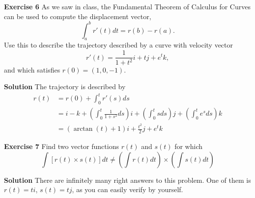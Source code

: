 \documentclass[12pt,oneside]{exam}
\newenvironment{exercise}[1]{\vspace{.1in}\noindent\textbf{Exercise #1 \hspace{.05em}}}{}
\newenvironment{newsolution}{\vspace{.1in}\noindent\textbf{Solution \hspace{.05em}}}{}
\begin{document}
\begin{exercise}{6}
As we saw in class, the Fundamental Theorem of Calculus for Curves can be used to compute the displacement vector, 
\begin{equation*}
\int_{a}^{b} r'(t) dt = r(b)-r(a).
\end{equation*}
Use this to describe the trajectory described by a curve with velocity vector 
\begin{equation*}
r'(t)=\frac{1}{1+t^2} i + tj + e^tk, 
\end{equation*}
and which satisfies $r(0)=(1,0,-1)$. 
\end{exercise}

\begin{newsolution}
The trajectory is described by 
\begin{align*}
r(t) & = r(0) + \int_{0}^{t} r'(s) ds \\
& = i -k  + \left( \int_{0}^{t} \frac{1}{1+s^2} ds \right) i + \left( \int_{0}^{t} s ds \right)j + \left(\int_{0}^{t} e^s ds \right)k\\
& = (\arctan(t)+1) i + \frac{t^2}{2}j + {e^t}k
\end{align*}
\end{newsolution}


\begin{exercise}{7}
Find two vector functions $r(t)$ and $s(t)$ for which 
\begin{equation*}
\int[ r(t) \times s(t)] dt  \neq \left(\int r(t) dt \right) \times \left( \int s(t) dt \right)
\end{equation*}
\end{exercise}

\begin{newsolution}
There are infinitely many right answers to this problem. One of them is $r(t)=ti$, $s(t)=tj$, as you can easily verify by yourself. 
\end{newsolution}
\end{document}
